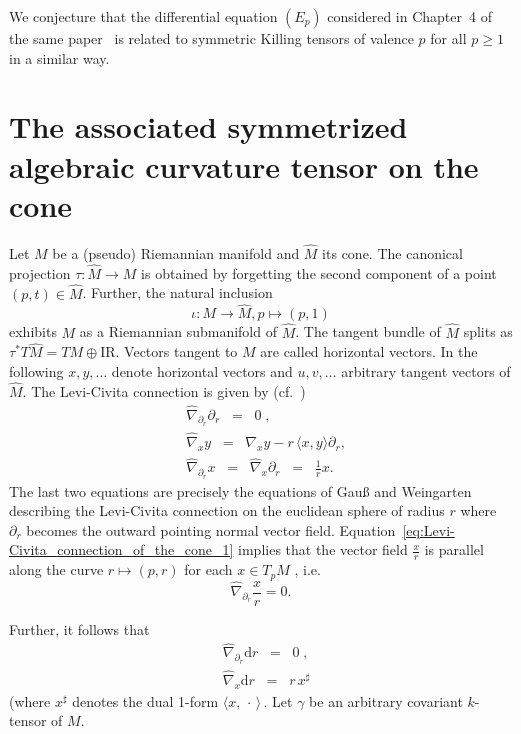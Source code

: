 \documentclass[11pt,a4paper]{article}
\theoremstyle{plain}
\theoremstyle{remark}
\newcommand{\R}{\mathrm{I\!R}}
\renewcommand{\d}{\mathrm{d}}
\def\pd{\partial}
\begin{document}
We conjecture that the differential equation $(E_p)$ considered in Chapter~4 of the same paper~\cite{Ga} is related to symmetric Killing tensors of valence $p$ for all $p\geq 1$ in a similar way.
\section{The associated symmetrized algebraic curvature tensor on the cone}
\label{se:prolongation_on_the_cone}
Let $M$ be a (pseudo) Riemannian manifold and $\hat M$ its cone. The canonical projection $\tau:\hat M\to M$
is obtained by forgetting the second component of a point $(p,t)\in \hat M$. 
Further, the natural inclusion 
\[
\iota \colon M \to \hat M,p\mapsto (p,1)
\] 
exhibits $M$ as a Riemannian submanifold of $\hat M$. 
The tangent bundle of $\hat M$ splits as $\tau^*T \hat M = T M \oplus \R$. 
Vectors tangent to $M$ are called horizontal vectors. 
In the following $x,y,\ldots$ denote horizontal vectors and $u,v,\ldots$
arbitrary tangent vectors of $\hat M$.  The Levi-Civita connection is given by (cf.~\cite[Ch.~1]{Ga})
\begin{align}\label{eq:Levi-Civita_connection_of_the_cone_1}
& \hat\nabla_{\partial_r} \partial_r\;\;=\;\;0\;,\\
\label{eq:Levi-Civita_connection_of_the_cone_3}
& \hat\nabla_x y\;\;=\;\;\nabla_x y - r\, \langle x,y\rangle \partial_r,\\
\label{eq:Levi-Civita_connection_of_the_cone_2}
&\hat\nabla_{\partial_r} x\;\;=\;\;\hat\nabla_x {\partial_r}\;\;=\;\;\frac{1}{r} x.
\end{align}
The last two equations are precisely the equations of Gauß and Weingarten 
describing the Levi-Civita connection on the euclidean sphere of radius $r$ where $\pd_r$ becomes the outward pointing normal vector field.
Equation~\eqref{eq:Levi-Civita_connection_of_the_cone_1} implies that the vector field $\frac{x}{r}$ is parallel along the curve $r\mapsto (p,r)$  for each $x\in T_pM$ , i.e.
\begin{equation}\label{eq:parallele_vektorfelder_laengs_radialer_kurven}
\hat\nabla_{\pd_r}\frac{x}{r} = 0.
\end{equation}

Further, it follows that
\begin{align}\label{eq:hat_nabla_diff_r}
& \hat\nabla_{\partial_r}\d r\;\;=\;\;0\;,\\
\label{eq:hat_nabla_x_dr}
& \hat\nabla_x\d r\;\;=\;\;r\, x^\sharp
\end{align}
(where $x^\sharp$ denotes the dual 1-form $\langle x,\,\cdot\,\rangle $\,. Let $\gamma$ be  an arbitrary covariant $k$-tensor of $M$. 
\end{document}
